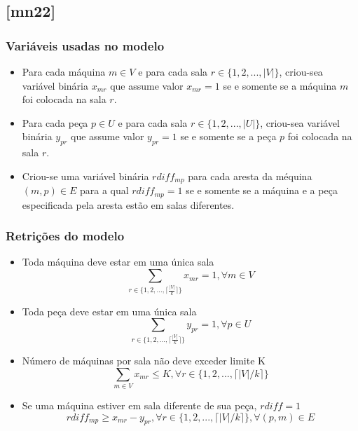 \documentclass[11pt,letterpaper]{article}
\begin{document}
\subsection{{[}mn22{]}}
\subsubsection*{Variáveis usadas no modelo}
\begin{itemize}
\item Para cada máquina $m \in V$ e para cada sala $r \in
  \{1,2,...,|V|\}$, criou-sea variável binária $x_{mr}$ que assume valor
  $x_{mr}=1$ se e somente se  a máquina $m$
  foi colocada na sala $r$.


\item Para cada peça $p \in U$ e para cada sala $r \in
  \{1,2,...,|U|\}$, criou-sea variável binária $y_{pr}$ que assume valor
  $y_{pr}=1$ se e somente se a peça $p$  foi colocada na sala $r$.

\item Criou-se uma variável binária $rdiff_{mp}$ para
  cada aresta da méquina $(m,p) \in  E$ para a qual
  $rdiff_{mp}=1$ se e somente se a máquina e a peça especificada pela aresta estão em salas diferentes.

\end{itemize}

\subsubsection*{Retrições do modelo}
\begin{itemize}
\item Toda máquina deve estar em uma única sala
\begin{equation*}
  \sum_{r \in  \{1,2,...,\lceil\frac{|V|}{k}\rceil\}}x_{mr}=1, \forall m \in V
\end{equation*}

\item Toda peça deve estar em uma única sala
\begin{equation*}
  \sum_{r \in  \{1,2,...,\lceil\frac{|V|}{k}\rceil\}}y_{pr}=1, \forall p \in U
\end{equation*}

\item Número de máquinas por sala não deve exceder limite K
\begin{equation*}
  \sum_{m \in V }x_{mr}\leq K, \forall r \in \{1,2,...,\lceil|V|/k\rceil\}
\end{equation*}

\item Se uma máquina estiver em sala diferente de sua peça, $rdiff=1$
\begin{equation*}
  rdiff_{mp}\geq x_{mr}-y_{pr}, \forall r \in \{1,2,...,\lceil|V|/k\rceil\}, \forall (p,m) \in E
\end{equation*}

\end{itemize}
\end{document}
